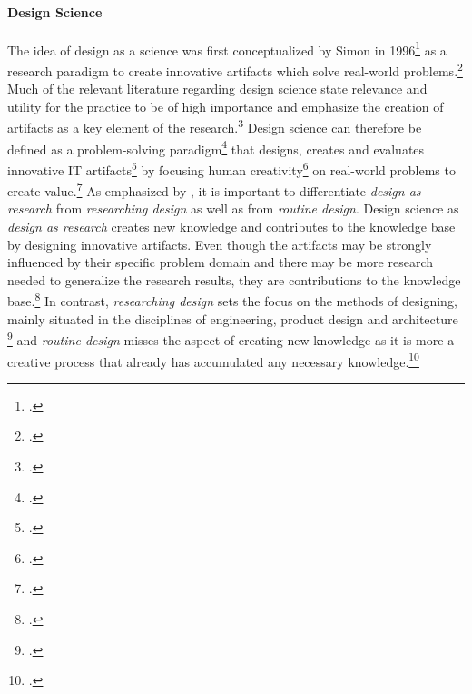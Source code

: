 \paragraph{Design Science}
The idea of design as a science was first conceptualized by Simon in 1996\footcite[Cf.][]{Simonsciencesartificial1996} as a research paradigm to create innovative artifacts which solve real-world problems.\footcite[Cf.][p.9]{HevnerDesignResearchInformation2010}
Much of the relevant literature regarding design science state relevance and utility for the practice to be of high importance and emphasize the creation of artifacts as a key element of the research.\footcites[Cf.][p.253, 254]{MarchDesignnaturalscience1995}[cf.][p.9, 11]{HevnerDesignResearchInformation2010}[cf.][p.77]{HevnerDesignScienceResearch2004}[cf.][p.1]{PapalambrosDesignScienceWhy2015}[cf.][p.330,342]{GregorPositioningpresentingdesign2013} Design science can therefore be defined as a problem-solving paradigm\footcite[Cf.][p.77]{HevnerDesignScienceResearch2004} that designs, creates and evaluates innovative IT artifacts\footcite[Cf.][p.90]{HevnerDesignScienceResearch2004} by focusing human creativity\footcite[Cf.][p.13]{HevnerDesignResearchInformation2010} on real-world problems to create value.\footcite[Cf.][p.1]{PapalambrosDesignScienceWhy2015} As emphasized by \cite{HevnerDesignResearchInformation2010}, it is important to differentiate \textit{design as research} from \textit{researching design} as well as from \textit{routine design}. Design science as \textit{design as research} creates new knowledge and contributes to the knowledge base by designing innovative artifacts. Even though the artifacts may be strongly influenced by their specific problem domain and there may be more research needed to generalize the research results, they are contributions to the knowledge base.\footcite[Cf.][p.15]{HevnerDesignResearchInformation2010} In contrast, \textit{researching design} sets the focus on the methods of designing, mainly situated in the disciplines of engineering, product design and architecture \footcite[Cf.][p.15]{HevnerDesignResearchInformation2010} and \textit{routine design} misses the aspect of creating new knowledge as it is more a creative process that already has accumulated any necessary knowledge.\footcite[Cf.][p.16]{HevnerDesignResearchInformation2010}



